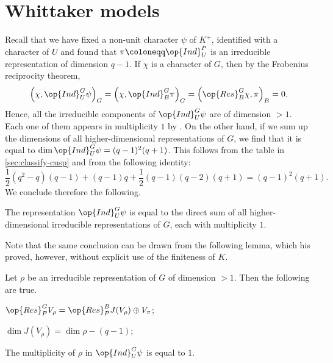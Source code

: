 \documentclass[../main.tex]{subfiles}
\begin{document}
\section{Whittaker models}
Recall that we have fixed a non-unit character $\psi$ of $K^+$, identified with a character of $U$ and found that $\pi\coloneqq\op{Ind}^P_U$ is an irreducible representation of dimension $q-1$. If $\chi$ is a character of $G$, then by the Frobenius reciprocity theorem,
\[\left(\chi,\op{Ind}^G_U\psi\right)_G=\left(\chi,\op{Ind}^G_B\pi\right)_G=\left(\op{Res}^G_B\chi,\pi\right)_B=0.\]
Hence, all the irreducible components of $\op{Ind}^G_U\psi$ are of dimension $>1$. Each one of them appears in multiplicity $1$ by . On the other hand, if we sum up the dimensions of all higher-dimensional representations of $G$, we find that it is equal to $\dim\op{Ind}^G_U\psi=(q-1)^2(q+1)$. This follows from the table in \cref{sec:classify-cusp} and from the following identity:
\[\frac12\left(q^2-q\right)(q-1)+(q-1)q+\frac12(q-1)(q-2)(q+1)=(q-1)^2(q+1).\]
We conclude therefore the following.
\begin{theorem} \label{thm:ind-psi-has-reps}
	The representation $\op{Ind}^G_U\psi$ is equal to the direct sum of all higher-dimensional irreducible representations of $G$, each with multiplicity $1$.
\end{theorem}
Note that the same conclusion can be drawn from the following lemma, which his proved, however, without explicit use of the finiteness of $K$.
\begin{lemma} \label{lem:ind-psi-has-reps}
	Let $\rho$ be an irreducible representation of $G$ of dimension $>1$. Then the following are true.
	\begin{listalph}
		\item $\op{Res}^G_PV_\rho=\op{Res}^B_PJ(V_\rho)\oplus V_\pi$;
		\item $\dim J(V_\rho)=\dim\rho-(q-1)$;
		\item The multiplicity of $\rho$ in $\op{Ind}^G_U\psi$ is equal to $1$.
	\end{listalph}
\end{lemma}
\end{document}

